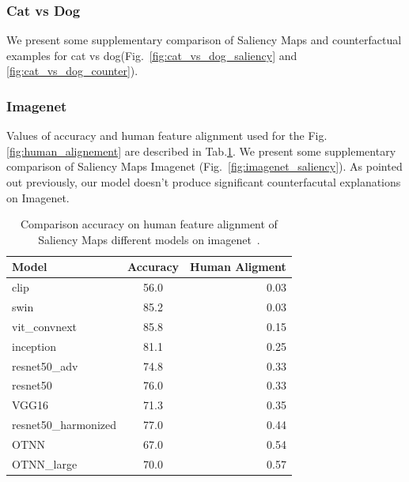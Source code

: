 \subsubsection{Cat vs Dog}
We present some supplementary comparison of Saliency Maps and counterfactual examples for cat vs dog(Fig.~\ref{fig:cat_vs_dog_saliency} and \ref{fig:cat_vs_dog_counter}).

\subsubsection{Imagenet}
Values of accuracy and human feature alignment used for the Fig.\ref{fig:human_alignement} are described in Tab.\ref{tab:harmo}.
We present some supplementary comparison of Saliency Maps Imagenet (Fig.~\ref{fig:imagenet_saliency}). As pointed out previously, our model doesn't produce significant counterfacutal explanations on Imagenet.

\begin{table}[h]
\caption{Comparison accuracy on human feature alignment of Saliency Maps different models on imagenet~\cite{ fel2022aligning}.} 
\label{tab:harmo}
  \centering

\begin{tabular}{lcr}
\hline
\textbf{Model}       & \textbf{Accuracy} & \textbf{Human Aligment} \\ \hline
clip                 & 56.0                & 0.03                    \\
swin                 & 85.2              & 0.03                    \\
vit\_convnext        & 85.8              & 0.15                    \\
inception            & 81.1              & 0.25                    \\
resnet50\_adv        & 74.8              & 0.33                    \\
resnet50             & 76.0              & 0.33                    \\
VGG16                & 71.3              & 0.35                    \\
resnet50\_harmonized & 77.0              & 0.44                    \\
OTNN                 & 67.0                & 0.54                    \\
OTNN\_large           & 70.0                & 0.57                    
\end{tabular}
\end{table}


